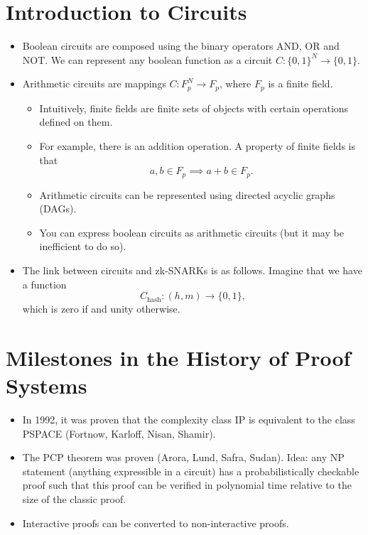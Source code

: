 \documentclass[twoside]{article}
\begin{document}
\section{Introduction to Circuits}
\begin{itemize}
\item Boolean circuits are composed using the binary operators AND, OR and NOT. We can represent any boolean function as a circuit $C: \{0,1\}^N \longrightarrow \{0,1\}$.
\item Arithmetic circuits are mappings $C: F_p^N \longrightarrow F_p$, where $F_p$ is a finite field.
	\begin{itemize}
	\item Intuitively, finite fields are finite sets of objects with certain operations defined on them.
	\item For example, there is an addition operation. A property of finite fields is that
		\begin{equation}
		a, b \in F_p \implies a+b \in F_p.
		\end{equation}
	\item Arithmetic circuits can be represented using directed acyclic graphs (DAGs).
	\item You can express boolean circuits as arithmetic circuits (but it may be inefficient to do so).
	\end{itemize}
\item The link between circuits and zk-SNARKs is as follows. Imagine that we have a function
	\begin{equation}
	C_{\text{hash}}: (h, m) \longrightarrow \{0,1\},
	\end{equation}
	which is zero if and unity otherwise.
\end{itemize}

\section{Milestones in the History of Proof Systems}
\begin{itemize}
\item In 1992, it was proven that the complexity class IP is equivalent to the class PSPACE (Fortnow, Karloff, Nisan, Shamir).
\item The PCP theorem was proven (Arora, Lund, Safra, Sudan). Idea: any NP statement (anything expressible in a circuit) has a probabilistically checkable proof such that this proof can be verified in polynomial time relative to the size of the classic proof.
\item Interactive proofs can be converted to non-interactive proofs.
\end{itemize}
\end{document}
